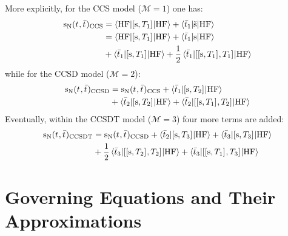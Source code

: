 More explicitly, for the \gls{CCS} model ($\mathcal{M} = 1$) one has:
\begin{equation}
  \begin{aligned}
    \mathrm{s}_{\mathrm{N}}(t_{}, \bar{t}_{})_\mathrm{CCS} &=
  \braket{\mathrm{HF} | [ \mathrm{s}, T_1 ]^{} | \mathrm{HF}}
  + \braket{\bar{t}_{1} | \check{\mathrm{s}} | \mathrm{HF}} \\
  &=
  \braket{\mathrm{HF} | [ \mathrm{s}, T_1 ]^{} | \mathrm{HF}}
  + \braket{\bar{t}_{1} | \mathrm{s} | \mathrm{HF}} \\
  &+ \braket{\bar{t}_{1} | [ \mathrm{s}, T_1 ]^{} | \mathrm{HF}}
  + \frac{1}{2}\braket{\bar{t}_{1} | [ [ \mathrm{s}, T_1 ]^{}, T_1 ]^{} | \mathrm{HF}}
  \end{aligned}
\end{equation}
while for the \gls{CCSD} model ($\mathcal{M} = 2$):
\begin{equation}
  \begin{aligned}
  \mathrm{s}_{\mathrm{N}}(t_{}, \bar{t}_{})_\mathrm{CCSD} &=
  \mathrm{s}_{\mathrm{N}}(t_{}, \bar{t}_{})_\mathrm{CCS}
  + \braket{\bar{t}_{1} | [ \mathrm{s}, T_2 ]^{} | \mathrm{HF}} \\
  &+ \braket{\bar{t}_{2} | [ \mathrm{s}, T_2 ]^{} | \mathrm{HF}}
  + \braket{\bar{t}_{2} | [ [ \mathrm{s}, T_1 ]^{}, T_2 ]^{} | \mathrm{HF}}
  \end{aligned}
\end{equation}
Eventually, within the \gls{CCSDT} model ($\mathcal{M} = 3$) four more
terms are added:
\begin{equation}
  \begin{aligned}
    \mathrm{s}_{\mathrm{N}}(t_{}, \bar{t}_{})_\mathrm{CCSDT} &=
  \mathrm{s}_{\mathrm{N}}(t_{}, \bar{t}_{})_\mathrm{CCSD}
  + \braket{\bar{t}_{2} | [ \mathrm{s}, T_3 ]^{} | \mathrm{HF}}
  + \braket{\bar{t}_{3} | [ \mathrm{s}, T_3 ]^{} | \mathrm{HF}} \\
  &+ \frac{1}{2}
  \braket{\bar{t}_{3} | [ [ \mathrm{s}, T_2 ]^{}, T_2 ]^{} |
  \mathrm{HF}}
  + \braket{\bar{t}_{3} | [ [ \mathrm{s}, T_1 ]^{}, T_3 ]^{} |
  \mathrm{HF}}
  \end{aligned}
\end{equation}

\section{Governing Equations and Their Approximations}\label{sec:pcm-cc-models}

